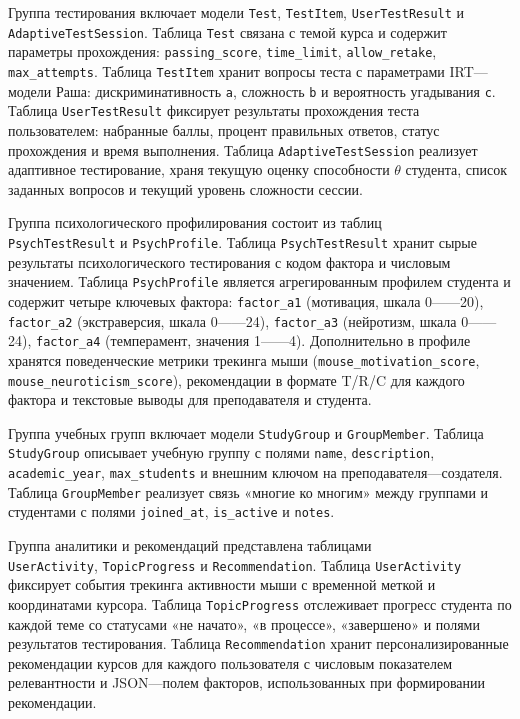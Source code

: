 Группа тестирования включает модели \texttt{Test}, \texttt{TestItem}, \texttt{UserTestResult} и \texttt{AdaptiveTestSession}. Таблица \texttt{Test} связана с темой курса и содержит параметры прохождения: \texttt{passing\_score}, \texttt{time\_limit}, \texttt{allow\_retake}, \texttt{max\_attempts}. Таблица \texttt{TestItem} хранит вопросы теста с параметрами IRT---модели Раша: дискриминативность \texttt{a}, сложность \texttt{b} и вероятность угадывания \texttt{c}. Таблица \texttt{UserTestResult} фиксирует результаты прохождения теста пользователем: набранные баллы, процент правильных ответов, статус прохождения и время выполнения. Таблица \texttt{AdaptiveTestSession} реализует адаптивное тестирование, храня текущую оценку способности $\theta$ студента, список заданных вопросов и текущий уровень сложности сессии.

Группа психологического профилирования состоит из таблиц\\ \texttt{PsychTestResult} и \texttt{PsychProfile}. Таблица \texttt{PsychTestResult} хранит сырые результаты психологического тестирования с кодом фактора и числовым значением. Таблица \texttt{PsychProfile} является агрегированным профилем студента и содержит четыре ключевых фактора: \texttt{factor\_a1} (мотивация, шкала 0------20), \texttt{factor\_a2} (экстраверсия, шкала 0------24), \texttt{factor\_a3} (нейротизм, шкала 0------24), \texttt{factor\_a4} (темперамент, значения 1------4). Дополнительно в профиле хранятся поведенческие метрики трекинга мыши (\texttt{mouse\_motivation\_score}, \texttt{mouse\_neuroticism\_score}), рекомендации в формате T/R/C для каждого фактора и текстовые выводы для преподавателя и студента.

Группа учебных групп включает модели \texttt{StudyGroup} и \texttt{GroupMember}. Таблица \texttt{StudyGroup} описывает учебную группу с полями \texttt{name}, \texttt{description}, \texttt{academic\_year}, \texttt{max\_students} и внешним ключом на преподавателя---создателя. Таблица \texttt{GroupMember} реализует связь «многие ко многим» между группами и студентами с полями \texttt{joined\_at}, \texttt{is\_active} и \texttt{notes}.

Группа аналитики и рекомендаций представлена таблицами\\ \texttt{UserActivity}, \texttt{TopicProgress} и \texttt{Recommendation}. Таблица \texttt{UserActivity} фиксирует события трекинга активности мыши с временной меткой и координатами курсора. Таблица \texttt{TopicProgress} отслеживает прогресс студента по каждой теме со статусами «не начато», «в процессе», «завершено» и полями результатов тестирования. Таблица \texttt{Recommendation} хранит персонализированные рекомендации курсов для каждого пользователя с числовым показателем релевантности и JSON---полем факторов, использованных при формировании рекомендации.

